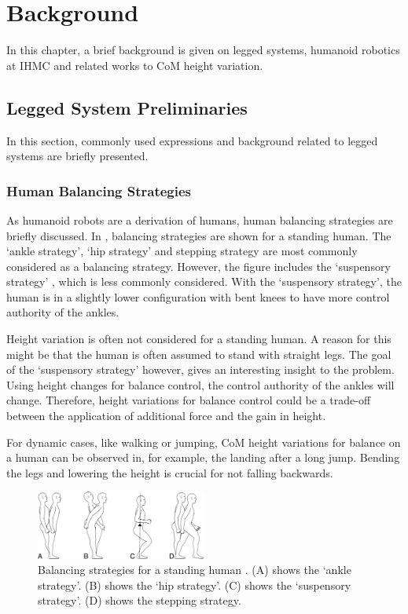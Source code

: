 %
\chapter{Background}\label{chap:background}
In this chapter, a brief background is given on legged systems, humanoid robotics at \ac{IHMC} and related works to \ac{CoM} height variation.
\section{Legged System Preliminaries}
In this section, commonly used expressions and background related to legged systems are briefly presented.
\subsection{Human Balancing Strategies}
As humanoid robots are a derivation of humans, human balancing strategies are briefly discussed. In , balancing strategies are shown for a standing human. The `ankle strategy', `hip strategy' and stepping strategy are most commonly considered as a balancing strategy. However, the figure includes the `suspensory strategy' \cite{hasson1994clinical}, which is less commonly considered. With the `suspensory strategy', the human is in a slightly lower configuration with bent knees to have more control authority of the ankles.

Height variation is often not considered for a standing human. A reason for this might be that the human is often assumed to stand with straight legs. The goal of the `suspensory strategy' however, gives an interesting insight to the problem. Using height changes for balance control, the control authority of the ankles will change. Therefore, height variations for balance control could be a trade-off between the application of additional force and the gain in height. 

For dynamic cases, like walking or jumping, \ac{CoM} height variations for balance on a human can be observed in, for example, the landing after a long jump. Bending the legs and lowering the height is crucial for not falling backwards.
\begin{figure}
\centering
\includegraphics[width=0.5\textwidth]{STYLESTUFF/humanbalance.jpg}
\caption{Balancing strategies for a standing human \cite{hasson1994clinical}. (A) shows the `ankle strategy'. (B) shows the `hip strategy'. (C) shows the `suspensory strategy'. (D) shows the stepping strategy.}
\label{fig:human}
\end{figure}
